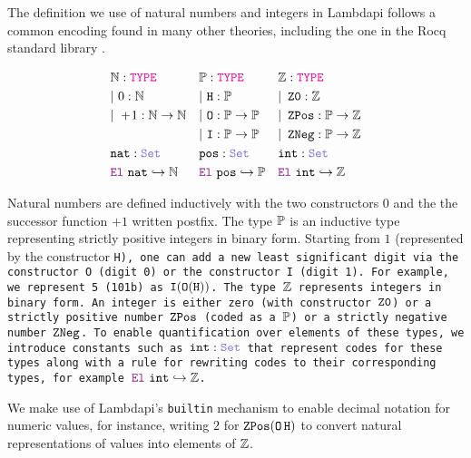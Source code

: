 \begin{definition}\label{def:ints}
The definition we use of natural numbers and integers in Lambdapi follows a common encoding found in many other theories, including the one in the Rocq standard library \cite{Rocq-refman}.

\begin{align*}\label{eq:eq1}
&\N: \type & &\bb{P}\index{$\bb{P}$}: \type & &\Z\index{$\bb{Z}$}: \type \\
&|~0: \N  & &|~\tt{H}\index{$\tt{H}$} : \bb{P} & &|~\ZO\index{$\ZO$}: \Z \\
&|~+\!1:\N \ra \N & &|~\tt{O}\index{$\tt{O}$}: \bb{P} \ra \bb{P} & &|~\ZPos\index{$\ZPos$}: \bb{P} \ra \Z \\
& & &|~\tt{I}\index{$\tt{I}$}: \bb{P} \ra \bb{P} & &|~\ZNeg\index{$\ZNeg$}: \bb{P} \ra \Z \\
&\tt{nat}\index{$\tt{nat}$}: \set & &\tt{pos}\index{$\tt{pos}$}: \set & &\tt{int}\index{$\tt{int}$}: \set \\
&\el~\tt{nat} \re \N & &\el~\tt{pos} \re \bb{P} & &\el~\tt{int} \re \Z
\end{align*}

Natural numbers are defined inductively with the two constructors $0$ and the the successor function $+\!1$ written postfix.
The type $\bb{P}$  is an inductive type representing strictly positive integers in binary form.
Starting from $1$ (represented by the constructor \tt{H}), one can add a new least significant digit via the constructor \tt{O} (digit 0) or the constructor \tt{I} (digit 1).
For example, we represent 5 (101b) as $\tt{I} (\tt{O} (\tt{H}))$. The type $\Z$ represents integers in binary form.
An integer is either zero (with constructor $\ZO$) or a strictly positive number $\ZPos$ (coded as a $\bb{P}$) or a strictly negative number $\ZNeg$.
To enable quantification over elements of these types, we introduce constants such as $\tt{int}:\set$ that represent codes for these types along with a rule for rewriting codes to their corresponding types, for example $\el~\tt{int} \re \Z$.
\end{definition}

We make use of Lambdapi's \lstinline[language=Lambdapi,basicstyle=\ttfamily\normalsize]|builtin| mechanism to enable decimal notation for numeric values, for instance, writing $2$ for $\ZPos (\mathop{\tt{O}} \tt{H})$ to convert natural representations of values into elements of $\Z$.

